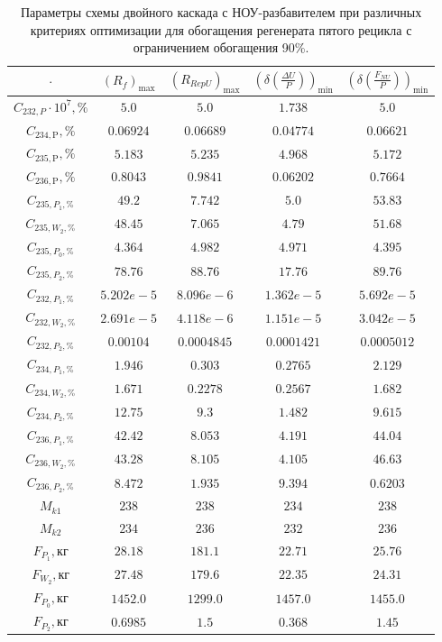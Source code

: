 \begin{table}
    \begin{tabular}{ccccc}
    $\cdot$ & $(R_f)_\text{max}$ & $(R_{RepU})_\text{max}$ & $(\delta(\frac{\Delta U}{P}))_\text{min}$ & $(\delta(\frac{F_{NU}}{P}))_\text{min}$\\ \hline
    $C_{232,P}\cdot10^{7}, \%$ & $5.0$ & $5.0$ & $1.738$ & $5.0$\\ \hline
    $C_{234,\text{P}}, \%$ & $0.06924$ & $0.06689$ & $0.04774$ & $0.06621$\\ \hline
    $C_{235,\text{P}}, \%$ & $5.183$ & $5.235$ & $4.968$ & $5.172$\\ \hline
    $C_{236,\text{P}}, \%$ & $0.8043$ & $0.9841$ & $0.06202$ & $0.7664$\\ \hline
    $C_{235,P_1, \%}$      & $49.2$ & $7.742$ & $5.0$ & $53.83$\\ \hline
    $C_{235,W_2, \%}$      & $48.45$ & $7.065$ & $4.79$ & $51.68$\\ \hline
    $C_{235,P_0, \%}$      & $4.364$ & $4.982$ & $4.971$ & $4.395$\\ \hline
    $C_{235,P_2, \%}$      & $78.76$ & $88.76$ & $17.76$ & $89.76$\\ \hline
    $C_{232,P_1, \%}$      & $5.202e-5$ & $8.096e-6$ & $1.362e-5$ & $5.692e-5$\\ \hline
    $C_{232,W_2, \%}$      & $2.691e-5$ & $4.118e-6$ & $1.151e-5$ & $3.042e-5$\\ \hline
    $C_{232,P_2, \%}$      & $0.00104$ & $0.0004845$ & $0.0001421$ & $0.0005012$\\ \hline
    $C_{234,P_1, \%}$      & $1.946$ & $0.303$ & $0.2765$ & $2.129$\\ \hline
    $C_{234,W_2, \%}$      & $1.671$ & $0.2278$ & $0.2567$ & $1.682$\\ \hline
    $C_{234,P_2, \%}$      & $12.75$ & $9.3$ & $1.482$ & $9.615$\\ \hline
    $C_{236,P_1, \%}$      & $42.42$ & $8.053$ & $4.191$ & $44.04$\\ \hline
    $C_{236,W_2, \%}$      & $43.28$ & $8.105$ & $4.105$ & $46.63$\\ \hline
    $C_{236,P_2, \%}$      & $8.472$ & $1.935$ & $9.394$ & $0.6203$\\ \hline
    $M_{k1}$               & $238$ & $238$ & $234$ & $238$\\ \hline
    $M_{k2}$               & $234$ & $236$ & $232$ & $236$\\ \hline
    $F_{P_1}, \text{кг}$   & $28.18$ & $181.1$ & $22.71$ & $25.76$\\ \hline
    $F_{W_2}, \text{кг}$   & $27.48$ & $179.6$ & $22.35$ & $24.31$\\ \hline
    $F_{P_0}, \text{кг}$   & $1452.0$ & $1299.0$ & $1457.0$ & $1455.0$\\ \hline
    $F_{P_2}, \text{кг}$   & $0.6985$ & $1.5$ & $0.368$ & $1.45$\\ \hline
    \end{tabular}
\caption{Параметры схемы двойного каскада с НОУ-разбавителем при различных критериях оптимизации для обогащения регенерата пятого рецикла с ограничением обогащения 90\%.{\label{2opt5_90}}}
\end{table}



